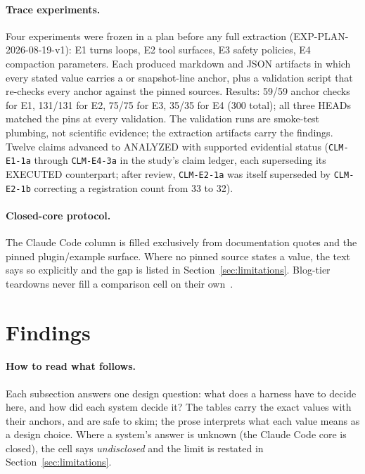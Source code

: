 \documentclass{article}
\newcommand{\ccc}[0]{Claude Code}
\begin{document}
\paragraph{Trace experiments.} Four experiments were frozen in a plan
before any full extraction (EXP-PLAN-2026-08-19-v1): E1 turns loops, E2
tool surfaces, E3 safety policies, E4 compaction parameters. Each produced
markdown and JSON artifacts in which every stated value carries a
 or snapshot-line anchor, plus a validation script that
re-checks every anchor against the pinned sources. Results: 59/59 anchor
checks for E1, 131/131 for E2, 75/75 for E3, 35/35 for E4
(300 total); all three HEADs matched the pins at every validation. The
validation runs are smoke-test plumbing, not scientific evidence; the
extraction artifacts carry the findings. Twelve claims advanced to
ANALYZED with supported evidential status (\texttt{CLM-E1-1a} through
\texttt{CLM-E4-3a} in the study's claim ledger, each superseding its
EXECUTED counterpart; after review, \texttt{CLM-E2-1a} was itself
superseded by \texttt{CLM-E2-1b} correcting a registration count from 33
to 32).

\paragraph{Closed-core protocol.} The \ccc{} column is filled exclusively
from documentation quotes and the pinned plugin/example surface. Where no
pinned source states a value, the text says so explicitly and the gap is
listed in Section~\ref{sec:limitations}. Blog-tier teardowns never fill a
comparison cell on their own~\citep{claudeCodeSurface,agiflowInternals}.

\section{Findings}
\label{sec:findings}

\paragraph{How to read what follows.} Each subsection answers one design
question: what does a harness have to decide here, and how did each
system decide it? The tables carry the exact values with their anchors,
and are safe to skim; the prose interprets what each value means as a
design choice. Where a system's answer is unknown (the \ccc{} core is
closed), the cell says \emph{undisclosed} and the limit is restated in
Section~\ref{sec:limitations}.
\end{document}
